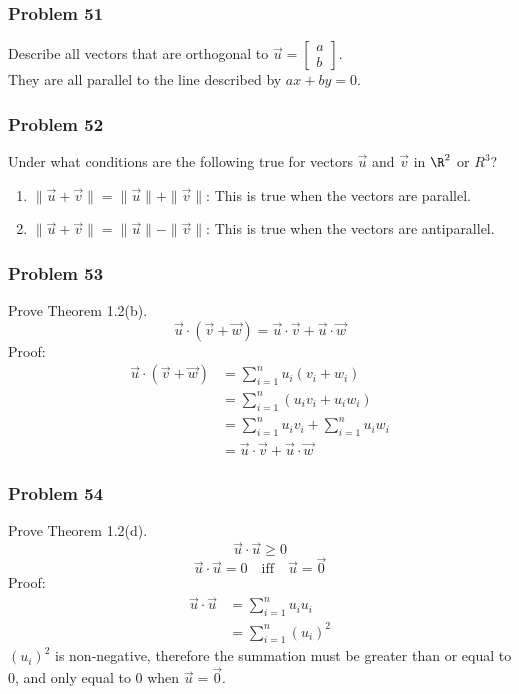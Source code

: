 \documentclass[letterpaper, 12pt]{math}
\begin{document}
\subsubsection*{Problem 51}
Describe all vectors that are orthogonal to \( \vec{u} = \begin{bmatrix}a \\ b
\end{bmatrix} \). \\
They are all parallel to the line described by \( ax+by = 0 \).

\subsubsection*{Problem 52}
Under what conditions are the following true for vectors \( \vec{u} \) and
\( \vec{v} \) in \( \R^2 \) or \( R^3 \)?
\begin{enumerate}
  \item \( \|\vec{u}+\vec{v}\| = \|\vec{u}\|+\|\vec{v}\| \):
    This is true when the vectors are parallel.
  \item \( \|\vec{u}+\vec{v}\| = \|\vec{u}\|-\|\vec{v}\| \):
    This is true when the vectors are antiparallel.
\end{enumerate}

\subsubsection*{Problem 53}
Prove Theorem 1.2(b).
\[ \vec{u}\cdot(\vec{v}+\vec{w}) = \vec{u}\cdot\vec{v}+\vec{u}\cdot\vec{w} \]
Proof:
\begin{align*}
  \vec{u}\cdot(\vec{v}+\vec{w}) &= \sum_{i=1}^{n}u_{i}(v_{i}+w_{i}) \\
  &= \sum_{i=1}^{n}(u_{i}v_{i}+u_{i}w_{i}) \\
  &= \sum_{i=1}^{n}u_{i}v_{i}+\sum_{i=1}^{n}u_{i}w_{i} \\
  &= \vec{u}\cdot\vec{v}+\vec{u}\cdot\vec{w}
\end{align*}

\subsubsection*{Problem 54}
Prove Theorem 1.2(d).
\[ \vec{u}\cdot\vec{u} \ge 0 \]
\[ \vec{u}\cdot\vec{u} = 0 \quad\text{iff}\quad \vec{u} = \vec{0} \]
Proof:
\begin{align*}
  \vec{u}\cdot\vec{u} &= \sum_{i=1}^{n}u_iu_i \\
  &= \sum_{i=1}^{n}(u_i)^{2}
\end{align*}
\( (u_i)^{2} \) is non-negative, therefore the summation must be greater than
or equal to 0, and only equal to 0 when \( \vec{u} = \vec{0} \).
\end{document}
